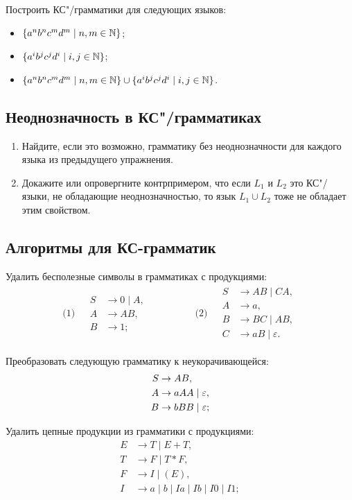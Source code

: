 Построить КС"/грамматики для следующих языков:
\begin{itemize}
    \item $\{ a^n b^n c^m d^m \mid n, m \in \mathbb N \}$;
    \item $\{a^i b^j c^j d^i \mid i, j \in \mathbb N\}$;
    \item $\{ a^n b^n c^m d^m \mid n, m \in \mathbb N \} \cup \{a^i b^j c^j d^i \mid i, j \in \mathbb N\}$.
\end{itemize}


\subsection*{Неоднозначность в КС"/грамматиках}

\begin{enumerate}
    \item Найдите, если это возможно, грамматику без
    неоднозначности для каждого языка из предыдущего упражнения.

    \item Докажите или опровергните контрпримером, что если
     $L_1$ и $L_2$ это КС"/языки,
    не обладающие неоднозначностью, то язык $L_1 \cup L_2$
    тоже не обладает этим свойством.
\end{enumerate}


\subsection*{Алгоритмы для КС-грамматик}

Удалить бесполезные символы в грамматиках с продукциями:
\begin{align*}
    \text{(1) }&
        \begin{aligned}%
            S &\to 0 \mid A,\\
            A &\to AB,\\
            B &\to 1;
        \end{aligned}
        \qquad\qquad
    &
    \text{(2) }&
        \begin{aligned}%
            S &\to AB \mid CA,\\
            A &\to a,\\
            B &\to BC \mid AB,\\
            C &\to aB \mid \varepsilon.
        \end{aligned}
\end{align*}

Преобразовать следующую грамматику к неукорачивающейся:
\begin{align*}
            S &\to  AB,\\
            A &\to aAA \mid \varepsilon,\\
            B &\to bBB \mid \varepsilon;
\end{align*}

Удалить цепные продукции из грамматики с продукциями:
\begin{align*}
            E &\to T \mid E+T,\\
            T &\to F \mid T*F,\\
            F &\to I \mid (E),\\
            I &\to a \mid b \mid Ia \mid Ib \mid I0 \mid I1;\\
\end{align*}
